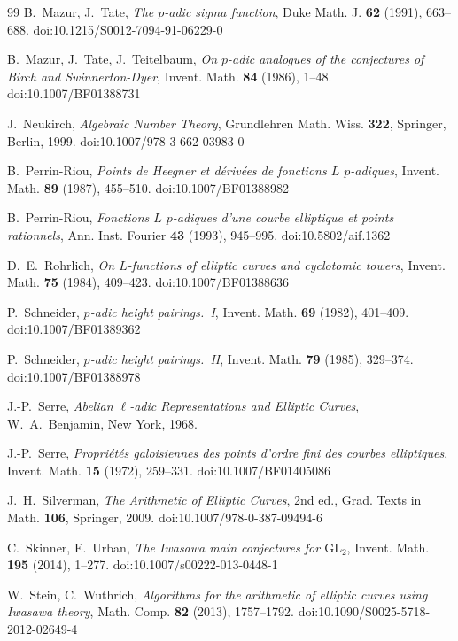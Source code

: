 \documentclass[11pt]{amsart}
\theoremstyle{definition}
\begin{document}
\begin{thebibliography}{99}
 B.~Mazur, J.~Tate, \emph{The $p$-adic sigma function}, Duke Math. J. \textbf{62} (1991), 663--688. doi:10.1215/S0012-7094-91-06229-0

 B.~Mazur, J.~Tate, J.~Teitelbaum, \emph{On $p$-adic analogues of the conjectures of Birch and Swinnerton-Dyer}, Invent. Math. \textbf{84} (1986), 1--48. doi:10.1007/BF01388731

 J.~Neukirch, \emph{Algebraic Number Theory}, Grundlehren Math. Wiss. \textbf{322}, Springer, Berlin, 1999. doi:10.1007/978-3-662-03983-0

 B.~Perrin-Riou, \emph{Points de Heegner et d\'eriv\'ees de fonctions $L$ $p$-adiques}, Invent. Math. \textbf{89} (1987), 455--510. doi:10.1007/BF01388982

 B.~Perrin-Riou, \emph{Fonctions $L$ $p$-adiques d'une courbe elliptique et points rationnels}, Ann. Inst. Fourier \textbf{43} (1993), 945--995. doi:10.5802/aif.1362

 D.~E.~Rohrlich, \emph{On $L$-functions of elliptic curves and cyclotomic towers}, Invent. Math. \textbf{75} (1984), 409--423. doi:10.1007/BF01388636

 P.~Schneider, \emph{$p$-adic height pairings.\ I}, Invent. Math. \textbf{69} (1982), 401--409. doi:10.1007/BF01389362

 P.~Schneider, \emph{$p$-adic height pairings.\ II}, Invent. Math. \textbf{79} (1985), 329--374. doi:10.1007/BF01388978

 J.-P.~Serre, \emph{Abelian $\ell$-adic Representations and Elliptic Curves}, W.~A.~Benjamin, New York, 1968.

 J.-P.~Serre, \emph{Propri\'et\'es galoisiennes des points d'ordre fini des courbes elliptiques}, Invent. Math. \textbf{15} (1972), 259--331. doi:10.1007/BF01405086

 J.~H.~Silverman, \emph{The Arithmetic of Elliptic Curves}, 2nd ed., Grad. Texts in Math. \textbf{106}, Springer, 2009. doi:10.1007/978-0-387-09494-6

 C.~Skinner, E.~Urban, \emph{The Iwasawa main conjectures for $\mathrm{GL}_2$}, Invent. Math. \textbf{195} (2014), 1--277. doi:10.1007/s00222-013-0448-1

 W.~Stein, C.~Wuthrich, \emph{Algorithms for the arithmetic of elliptic curves using Iwasawa theory}, Math. Comp. \textbf{82} (2013), 1757--1792. doi:10.1090/S0025-5718-2012-02649-4


\end{thebibliography}
\end{document}
